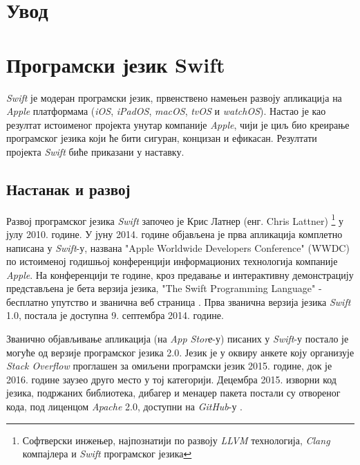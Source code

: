 \documentclass[12pt,oneside]{memoir}
\begin{document}
\frontmatter
\naslovna
\komisija
\apstrakt
\tableofcontents*

\mainmatter

\chapter{Увод}

\chapter{Програмски језик Swift}

\indent \textit{Swift} је модеран програмски језик, првенствено намењен развоју  апликациjа на \textit{Apple} платформама (\textit{iOS}, \textit{iPadOS}, \textit{macOS}, \textit{tvOS} и \textit{watchOS}). Настао је као резултат истоименог пројекта унутар компаније \textit{Apple}, чији је циљ био креирање програмског језика  који ће бити сигуран, концизан и ефикасан. Резултати пројекта \textit{Swift} биће приказани у наставку. 

\section{Настанак и развој}

\indent Развој програмског језика \textit{Swift} започео је Крис Латнер (енг. Chris Lattner) \footnote{Софтверски инжењер, најпознатији по развоју \textit{LLVM}  технологија, \textit{Clang} компајлера и \textit{Swift} програмског језика} у јулу 2010. године. У јуну 2014. године објављена је прва апликација комплетно написана у \textit{Swift}-у, названа "Apple Worldwide Developers Conference" (WWDC) по истоименој годишњој конференцији информационих технологија компаније \textit{Apple}. На конференцији те године, кроз предавање и интерактивну демонстрацију представљена је бета верзија језика, "The Swift Programming Language" \cite{The_Swift_Programming_Language} - бесплатно упутство и званична веб страница \cite{SwiftOfficialSite}. Прва званична верзија језика \textit{Swift} 1.0, постала је доступна 9. септембра 2014. године.

\indent Званично објављивање апликација (на \textit{App Storе}-у) писаних у \textit{Swift}-у постало је могуће од верзије програмског језика 2.0. Језик је у оквиру анкете коју организује  \textit{Stack Overflow}  \cite{StackOverflow} проглашен за омиљени програмски језик 2015. године, док је 2016. године заузео друго место у тој категорији. Децембра 2015. изворни код језика, подржаних библиотека, дибагер и менаџер пакета постали су отвореног кода, под лиценцом \textit{Apache} 2.0, доступни на \textit{GitHub}-у \cite{GitHub_Swift}.
\end{document}
